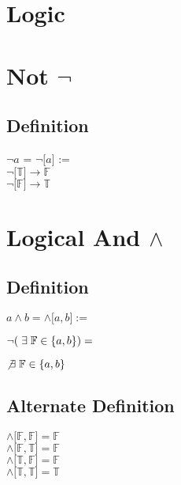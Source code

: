 \documentclass[11pt]{article}
\begin{document}
\section*{Logic}





\section{Not $\lnot$}
\subsection{Definition}
\begin{center}
$\lnot a$ = $\lnot \lbrack a \rbrack$ :=\\
\vspace{2mm}
$\lnot \lbrack \mathbb{T} \rbrack \rightarrow \mathbb{F}$\\
\vspace{2mm}
$\lnot \lbrack \mathbb{F} \rbrack \rightarrow \mathbb{T}$
\end{center}






\section{Logical And $\land$}
\subsection{Definition}
\begin{center}
$
a \land b = \land \lbrack{a,b}\rbrack :=
$
\end{center}
\begin{center}
$\lnot (\hspace{1mm} \exists \hspace{1mm} \mathbb{F} \in \{a,b\}) =$

$\vspace{1.5mm} \not \exists \hspace{1mm} \mathbb{F} \in \{a,b\}$
\end{center}




\subsection{Alternate Definition}
\begin{center}
$\land \lbrack\mathbb{F}, \mathbb{F}\rbrack = \mathbb{F}$ \\
$\land \lbrack\mathbb{F}, \mathbb{T}\rbrack = \mathbb{F}$ \\
$\land \lbrack\mathbb{T}, \mathbb{F}\rbrack = \mathbb{F}$ \\
$\land \lbrack\mathbb{T}, \mathbb{T}\rbrack = \mathbb{T}$ \\
\end{center}
\end{document}
